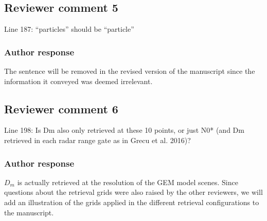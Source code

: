 \documentclass[11pt]{scrartcl}
\providecommand{\DIFadd}[1]{{\protect\textcolor{blue}{\uwave{#1}}}} %
\providecommand{\DIFdel}[1]{{\protect\textcolor{red}{\sout{#1}}}}                      %
\providecommand{\DIFaddbegin}{} %
\providecommand{\DIFaddend}{} %
\providecommand{\DIFdelbegin}{} %
\providecommand{\DIFaddFL}[1]{\DIFadd{#1}} %
\newenvironment{change}[1][]{%
  \begin{mdframed}[frametitle={Line #1:}]%
}{%
  \end{mdframed}%
}
\begin{document}

\subsection*{Reviewer comment 5}
Line 187: “particles” should be “particle”

\subsubsection*{Author response}

The sentence will be removed in the revised version of the manuscript since
the information it conveyed was deemed irrelevant.



\subsection*{Reviewer comment 6}
Line 198: Is Dm also only retrieved at these 10 points, or just N0* (and Dm retrieved in each radar range gate as in Grecu et al. 2016)?

\subsubsection*{Author response}

$D_m$ is actually retrieved at the resolution of the GEM model scenes. Since
questions about the retrieval grids were also raised by the other reviewers, we
will add an illustration of the grids applied in the different retrieval
configurations to the manuscript.


\end{document}
